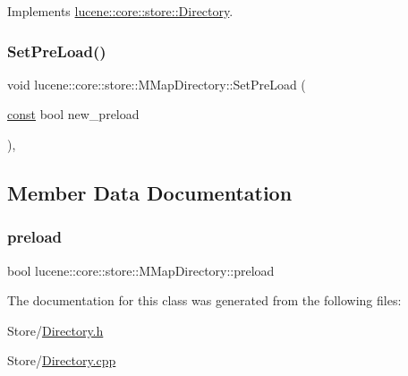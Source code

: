 Implements \mbox{\hyperlink{classlucene_1_1core_1_1store_1_1Directory_a4889bc9f58be58f28cc6e0846fbd516c}{lucene\+::core\+::store\+::\+Directory}}.

\mbox{\label{classlucene_1_1core_1_1store_1_1MMapDirectory_a1089bb27f5e5189909bb98835c49965b}} 
\subsubsection{\texorpdfstring{Set\+Pre\+Load()}{SetPreLoad()}}
{\footnotesize\ttfamily void lucene\+::core\+::store\+::\+M\+Map\+Directory\+::\+Set\+Pre\+Load (\begin{DoxyParamCaption}\item[{\mbox{\hyperlink{ZlibCrc32_8h_a2c212835823e3c54a8ab6d95c652660e}{const}} bool}]{new\+\_\+preload }\end{DoxyParamCaption})\hspace{0.3cm}{\ttfamily [inline]}, {\ttfamily [noexcept]}}



\subsection{Member Data Documentation}
\mbox{\label{classlucene_1_1core_1_1store_1_1MMapDirectory_a7bd67252d7136e8185bf3a1cffc8245e}} 
\subsubsection{\texorpdfstring{preload}{preload}}
{\footnotesize\ttfamily bool lucene\+::core\+::store\+::\+M\+Map\+Directory\+::preload\hspace{0.3cm}{\ttfamily [private]}}



The documentation for this class was generated from the following files\+:\begin{DoxyCompactItemize}
\item 
Store/\mbox{\hyperlink{Directory_8h}{Directory.\+h}}\item 
Store/\mbox{\hyperlink{Directory_8cpp}{Directory.\+cpp}}\end{DoxyCompactItemize}
